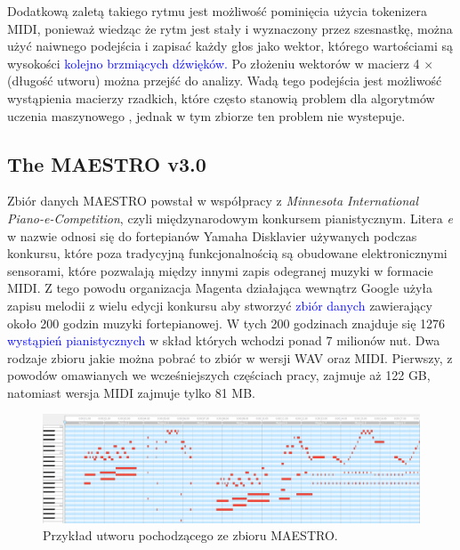 \documentclass[data-science]{agh-wi} %
\begin{document}
Dodatkową zaletą takiego rytmu jest możliwość pominięcia użycia tokenizera MIDI, ponieważ wiedząc że rytm jest stały i wyznaczony przez szesnastkę, można użyć naiwnego podejścia i zapisać każdy głos jako wektor, którego wartościami są wysokości \textcolor{blue}{kolejno brzmiących dźwięków.} Po złożeniu wektorów w macierz 4 $\times$ (długość utworu) można przejść do analizy. Wadą tego podejścia jest możliwość wystąpienia macierzy rzadkich, które często stanowią problem dla algorytmów uczenia maszynowego \cite*{sparse_matrix}, jednak w tym zbiorze ten problem nie wystepuje.

\subsection{The MAESTRO v3.0}
Zbiór danych MAESTRO \cite{maestrov3} powstał w współpracy z \textit{Minnesota International Piano-e-Competition}, czyli międzynarodowym konkursem pianistycznym. Litera \textit{e} w nazwie odnosi się do fortepianów Yamaha Disklavier używanych podczas konkursu, które poza tradycyjną funkcjonalnością są obudowane elektronicznymi sensorami, które pozwalają między innymi zapis odegranej muzyki w formacie MIDI. Z tego powodu organizacja Magenta działająca wewnątrz Google użyła zapisu melodii z wielu edycji konkursu aby stworzyć \textcolor{blue}{zbiór danych} zawierający około 200 godzin muzyki fortepianowej. W tych 200 godzinach znajduje się 1276 \textcolor{blue}{wystąpień pianistycznych} w skład których wchodzi ponad 7 milionów nut. Dwa rodzaje zbioru jakie można pobrać to zbiór w wersji WAV oraz MIDI. Pierwszy, z powodów omawianych we wcześniejszych częściach pracy, zajmuje aż 122 GB, natomiast wersja MIDI zajmuje tylko 81 MB.
\begin{figure}[ht!]
    \begin{center}
        \includegraphics[width=0.9\linewidth]{./img/maestro_1.png}
    \end{center}
    \caption{{Przykład utworu pochodzącego ze zbioru MAESTRO.}}\label{fig:maestro_midi}
\end{figure}
\end{document}
